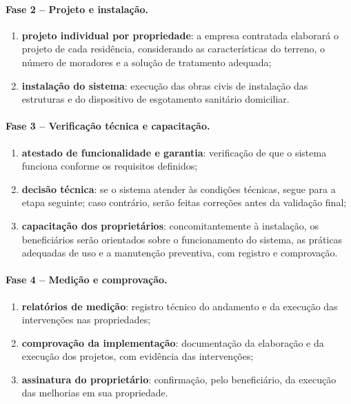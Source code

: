 \paragraph{Fase 2 -- Projeto e instalação.}
\begin{enumerate}[label=\alph*), resume]
  \item \textbf{projeto individual por propriedade}: a empresa contratada
        elaborará o projeto de cada residência, considerando as
        características do terreno, o número de moradores e a solução de
        tratamento adequada;
  \item \textbf{instalação do sistema}: execução das obras civis de
        instalação das estruturas e do dispositivo de esgotamento sanitário
        domiciliar.
\end{enumerate}

\paragraph{Fase 3 -- Verificação técnica e capacitação.}
\begin{enumerate}[label=\alph*), resume]
  \item \textbf{atestado de funcionalidade e garantia}: verificação de que o
        sistema funciona conforme os requisitos definidos;
  \item \textbf{decisão técnica}: se o sistema atender às condições
        técnicas, segue para a etapa seguinte; caso contrário, serão feitas
        correções antes da validação final;
  \item \textbf{capacitação dos proprietários}: concomitantemente à
        instalação, os beneficiários serão orientados sobre o funcionamento
        do sistema, as práticas adequadas de uso e a manutenção preventiva,
        com registro e comprovação.
\end{enumerate}

\paragraph{Fase 4 -- Medição e comprovação.}
\begin{enumerate}[label=\alph*), resume]
  \item \textbf{relatórios de medição}: registro técnico do andamento e da
        execução das intervenções nas propriedades;
  \item \textbf{comprovação da implementação}: documentação da elaboração e
        da execução dos projetos, com evidência das intervenções;
  \item \textbf{assinatura do proprietário}: confirmação, pelo beneficiário,
        da execução das melhorias em sua propriedade.
\end{enumerate}

